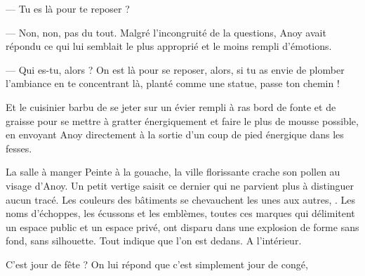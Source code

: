 --- Tu es là pour te reposer ?

--- Non, non, pas du tout. Malgré l'incongruité de la questions, Anoy
avait répondu ce qui lui semblait le plus approprié et le moins
rempli d'émotions.

--- Qui es-tu, alors ? On est là pour se reposer, alors, si tu as envie
de plomber l'ambiance en te concentrant là, planté comme une statue,
passe ton chemin !

Et le cuisinier barbu de se jeter sur un évier rempli à ras bord de
fonte et de graisse pour se mettre à gratter énergiquement et faire le
plus de mousse possible, en envoyant Anoy directement à la sortie d'un
coup de pied énergique dans les fesses.

La salle à manger
Peinte à la gouache, la ville florissante crache son pollen au visage
d'Anoy. Un petit vertige saisit ce dernier qui ne parvient plus à
distinguer aucun tracé. Les couleurs des bâtiments se chevauchent les
unes aux autres, . Les noms d'échoppes, les écussons et les emblèmes,
toutes ces marques qui délimitent un espace public et un espace privé,
ont disparu dans une explosion de forme sans fond, sans
silhouette. Tout indique que l'on est dedans. A l'intérieur.

C'est jour de fête ?  On lui répond que c'est simplement jour de
congé,

